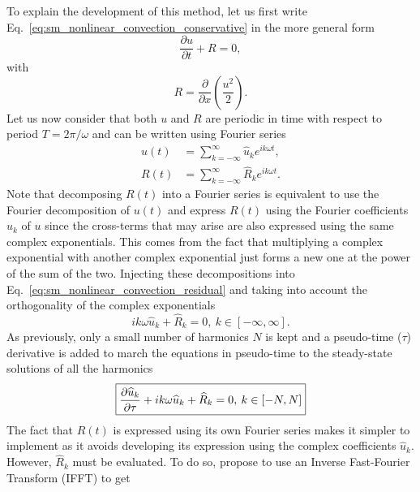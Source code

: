 To explain the development of this method, let us first 
write Eq.~\eqref{eq:sm_nonlinear_convection_conservative} 
in the more general form
\begin{equation}
	\frac{\partial u}{\partial t} + R = 0,
	\label{eq:sm_nonlinear_convection_residual}
\end{equation}
with
\begin{equation}
	R = \frac{\partial}{\partial x} \left( 
	\frac{u^2}{2} \right).
\end{equation}
Let us now consider that both $u$ and $R$ are periodic
in time with respect to period $T = 2 \pi / \omega$
and can be written using Fourier series
\begin{equation}
	\begin{split}
		u(t) &= \sum_{k=-\infty}^{\infty} \widehat{u}_k e^{i k \omega t}, \\
		R(t) &= \sum_{k=-\infty}^{\infty} \widehat{R}_k e^{i k \omega t}.
	\end{split}
\end{equation}
Note that decomposing $R(t)$ into a Fourier series is equivalent
to use the Fourier decomposition of $u(t)$ and express
$R(t)$ using the Fourier coefficients $\widehat{u}_k$ of $u$
since the cross-terms that may arise are also expressed 
using the same complex exponentials. This comes from the fact
that multiplying a complex exponential with another complex exponential
just forms a new one at the power of the sum of the
two.
Injecting these decompositions into 
Eq.~\eqref{eq:sm_nonlinear_convection_residual} and taking into account
the orthogonality of the complex exponentials
\begin{equation}
	i k \omega \widehat{u}_k + \widehat{R}_k = 0, \: k \in [-\infty, \infty].
\end{equation}
As previously, only a small number of harmonics $N$ is kept and 
a pseudo-time ($\tau$) derivative is added to march the equations
in pseudo-time to the steady-state solutions of all the harmonics
\begin{equation}
	\fbox{$
	\displaystyle \frac{\partial \widehat{u}_k}{\partial \tau} + 
	i k \omega \widehat{u}_k + \widehat{R}_k = 0, \: k \in [-N, N]
	$}
	\label{eq:sm_nlfd_subset_eq}
\end{equation}
The fact that $R(t)$ is expressed using its own Fourier series 
makes it simpler to implement 
as it avoids developing its expression using 
the complex coefficients $\widehat{u}_k$. 
However, $\widehat{R}_k$ must be evaluated. To do so, \citet{McMullen2001}
propose to use an Inverse Fast-Fourier Transform (IFFT) to get
